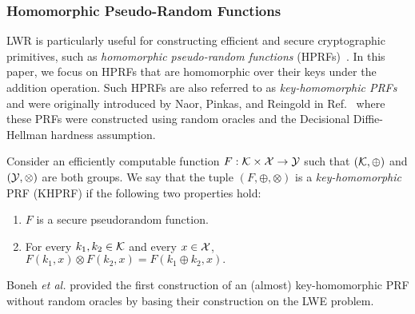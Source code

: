 \subsubsection{Homomorphic Pseudo-Random Functions}
LWR is particularly useful for constructing efficient and secure cryptographic primitives, such as \emph{homomorphic pseudo-random functions} (HPRFs)~\cite{boneh2013key}.
In this paper, we focus on HPRFs that are homomorphic over their keys under the addition operation.
Such HPRFs are also referred to as \emph{key-homomorphic PRFs} and were originally introduced by Naor, Pinkas, and Reingold in Ref.~\cite{naor1999distributed} where these PRFs were constructed using random oracles and the Decisional Diffie-Hellman hardness assumption.
\newpage
\begin{definition}
	Consider an efficiently computable function $F: \mathcal{K} \times \mathcal{X} \to \mathcal{Y}$ such that $(\mathcal{K}, \oplus)$ and $(\mathcal{Y}, \otimes)$ are both groups.
	We say that the tuple $(F, \oplus, \otimes)$ is a \emph{key-homomorphic} PRF (KHPRF) if the following two properties hold:
	\begin{enumerate}
		\item $F$ is a secure pseudorandom function.
		\item For every $k_1, k_2 \in \mathcal{K}$ and every $x \in \mathcal{X}$, $F\left(k_1, x\right) \otimes F\left(k_2, x\right) = F\left(k_1 \oplus k_2, x\right).$
	\end{enumerate}
	\end{definition}

Boneh \emph{et al.} provided the first construction of an (almost) key-homomorphic PRF without random oracles by basing their construction on the LWE problem.


